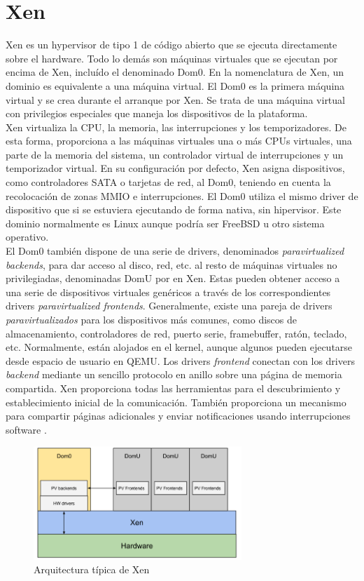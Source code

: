 \section{Xen}
Xen \cite{xen_arm_whitepaper} es un hypervisor de tipo 1 de código abierto que se ejecuta directamente sobre el hardware. Todo lo demás son máquinas virtuales que se ejecutan por encima de Xen, incluído el denominado Dom0. En la nomenclatura de Xen, un dominio es equivalente a una máquina virtual. El Dom0 es la primera máquina virtual y se crea durante el arranque por Xen. Se trata de una máquina virtual con privilegios especiales que maneja los dispositivos de la plataforma.\\
Xen virtualiza la CPU, la memoria, las interrupciones y los temporizadores. De esta forma, proporciona a las máquinas virtuales una o más CPUs virtuales, una parte de la memoria del sistema, un controlador virtual de interrupciones y un temporizador virtual. En su configuración por defecto, Xen asigna dispositivos, como controladores SATA o tarjetas de red, al Dom0, teniendo en cuenta la recolocación de zonas MMIO e interrupciones. El Dom0 utiliza el mismo driver de dispositivo que si se estuviera ejecutando de forma nativa, sin hipervisor. Este dominio normalmente es Linux aunque podría ser FreeBSD u otro sistema operativo.\\
El Dom0 también dispone de una serie de drivers, denominados \textit{paravirtualized backends}, para dar acceso al disco, red, etc. al resto de máquinas virtuales no privilegiadas, denominadas DomU por en Xen. Estas pueden obtener acceso a una serie de dispositivos virtuales genéricos a través de los correspondientes drivers \textit{paravirtualized frontends}. Generalmente, existe una pareja de drivers \textit{paravirtualizados} para los dispositivos más comunes, como discos de almacenamiento, controladores de red, puerto serie, framebuffer, ratón, teclado, etc. Normalmente, están alojados en el kernel, aunque algunos pueden ejecutarse desde espacio de usuario en QEMU. Los drivers \textit{frontend} conectan con los drivers \textit{backend} mediante un sencillo protocolo en anillo sobre una página de memoria compartida. Xen proporciona todas las herramientas para el descubrimiento y establecimiento inicial de la comunicación. También proporciona un mecanismo para compartir páginas adicionales y enviar notificaciones usando interrupciones software \cite{xen_arm_whitepaper}.\\

\begin{figure}[!htb]
  \centering
  \includegraphics[width=0.70\textwidth]{recursos/xen_1.png}
  \caption{Arquitectura típica de Xen}
  \label{fig:xen_1}
\end{figure}

